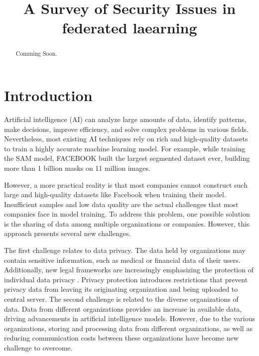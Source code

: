 \documentclass[conference]{IEEEtran}
\begin{document}
\title{A Survey of Security Issues in federated laearning}

\author{
    \and

}

\maketitle

\begin{abstract}
    Comming Soon.
\end{abstract}



\section{Introduction}
Artificial intelligence (AI) can analyze large amounts of data, 
identify patterns, make decisions, improve efficiency, and solve complex problems 
in various fields.
Nevertheless, most existing AI techniques rely on rich and high-quality 
datasets to train a highly accurate machine learning model.
For example, while training the SAM model, 
FACEBOOK \cite{b1}  built the largest segmented dataset ever, 
building more than 1 billion masks on 11 million images.

However, a more practical reality is that most companies cannot 
construct such large and high-quality datasets like Facebook 
when training their model. 
Insufficient samples and low data quality are the actual challenges 
that most companies face in model training. 
To address this problem, one possible solution 
is the sharing of data among multiple organizations or companies. 
However, this approach presents several new challenges.

The first challenge relates to data privacy. 
The data held by organizations may contain sensitive information, 
such as medical or financial data of their users. 
Additionally, new legal frameworks are increasingly 
emphasizing the protection of individual data privacy \cite{b2}. 
Privacy protection introduces restrictions that prevent 
privacy data from leaving its originating organization 
and being uploaded to central server.
The second challenge is related to the diverse organizations of data. 
Data from different organizations provides an increase in available data, 
driving advancements in artificial intelligence models. 
However, due to the various organizations, 
storing and processing data from different organizations, 
as well as reducing communication costs between these organizations 
have become new challenge to overcome.
\end{document}

